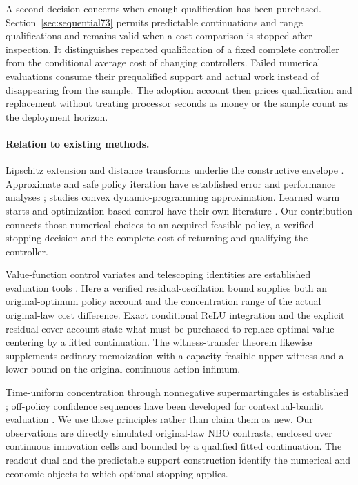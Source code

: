\documentclass[ecta,nameyear,draft]{econsocart}
\begin{document}
A second decision concerns when enough qualification has been purchased. Section~\ref{sec:sequential73} permits predictable continuations and range qualifications and remains valid when a cost comparison is stopped after inspection. It distinguishes repeated qualification of a fixed complete controller from the conditional average cost of changing controllers. Failed numerical evaluations consume their prequalified support and actual work instead of disappearing from the sample. The adoption account then prices qualification and replacement without treating processor seconds as money or the sample count as the deployment horizon.

\paragraph{Relation to existing methods.}
Lipschitz extension and distance transforms underlie the constructive envelope \citep{mcshane1934,felzenszwalb2012}. Approximate and safe policy iteration have established error and performance analyses \citep{munos2003,pirotta2013,scherrer2015}; \citet{yang2020convex} studies convex dynamic-programming approximation. Learned warm starts and optimization-based control have their own literature \citep{sakaue2023warm,sambharya2023,agrawal2020control}. Our contribution connects those numerical choices to an acquired feasible policy, a verified stopping decision and the complete cost of returning and qualifying the controller.

Value-function control variates and telescoping identities are established evaluation tools \citep{munos2006variance,jiang2016}. Here a verified residual-oscillation bound supplies both an original-optimum policy account and the concentration range of the actual original-law cost difference. Exact conditional ReLU integration and the explicit residual-cover account state what must be purchased to replace optimal-value centering by a fitted continuation. The witness-transfer theorem likewise supplements ordinary memoization with a capacity-feasible upper witness and a lower bound on the original continuous-action infimum.

Time-uniform concentration through nonnegative supermartingales is established \citep{howard2020time}; off-policy confidence sequences have been developed for contextual-bandit evaluation \citep{karampatziakis2021}. We use those principles rather than claim them as new. Our observations are directly simulated original-law NBO contrasts, enclosed over continuous innovation cells and bounded by a qualified fitted continuation. The readout dual and the predictable support construction identify the numerical and economic objects to which optional stopping applies.
\end{document}
